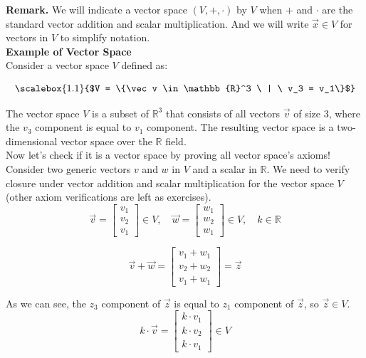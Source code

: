 \textbf{Remark.} We will indicate a vector space $(V, +, \cdot)$ by $V$
when $+$ and $\cdot$ are the standard vector addition and scalar multiplication.
And we will write $\vec x \in V$ for vectors in $V$ to simplify notation.
\\

\textbf{Example of Vector Space}
\\

Consider a vector space $V$ defined as:

$$
\scalebox{1.1}{$V = \{\vec v \in \mathbb{R}^3 \ | \ v_3 = v_1\}$}
$$

The vector space \(V\) is a subset of \(\mathbb{R}^3\) that consists of all vectors \(\vec{v}\) of size 3, where the $v_3$ component is equal to $v_1$ component. The resulting vector space is a two-dimensional vector space over the $\mathbb R$ field.
\\

Now let's check if it is a vector space by proving all vector space's axioms!
\\

Consider two generic vectors $v$ and $w$ in $V$ and a scalar in $\mathbb R$. We need to verify closure under vector addition and scalar multiplication for the vector space $V$ (other axiom verifications are left as exercises).
$$
\vec v =\begin{bmatrix}
    v_1 \\
    v_2 \\
    v_1
\end{bmatrix} \in V, \quad \vec w =\begin{bmatrix}
    w_1 \\
    w_2 \\
    w_1
\end{bmatrix} \in V, \quad k \in \mathbb{R}
$$

$$
\vec v + \vec w =\begin{bmatrix}
    v_1 + w_1\\
    v_2 + w_2 \\
    v_1 + w_1
\end{bmatrix} = \vec z
$$

As we can see, the $z_3$ component of $\vec z$ is equal to $z_1$ component of $\vec z$, so $\vec z \in V$.
$$
k \cdot \vec v =\begin{bmatrix}
    k \cdot v_1 \\
    k \cdot v_2 \\
    k \cdot v_1
\end{bmatrix} \in V
$$

